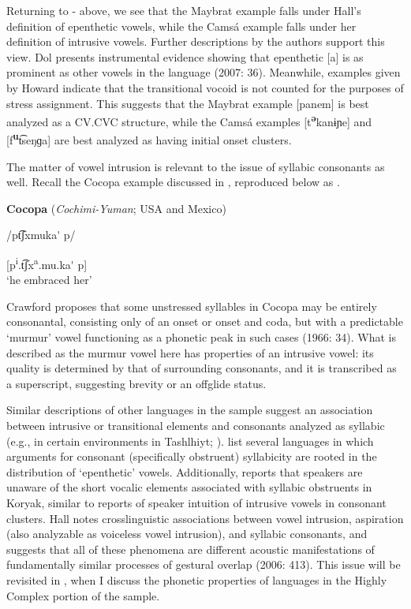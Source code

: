   Returning to - above, we see that the Maybrat example falls under Hall’s definition of epenthetic vowels, while the Camsá example falls under her definition of intrusive vowels. Further descriptions by the authors support this view. Dol presents instrumental evidence showing that epenthetic [a] is as prominent as other vowels in the language (2007: 36). Meanwhile, examples given by Howard indicate that the transitional vocoid is not counted for the purposes of stress assignment. This suggests that the Maybrat example [panem] is best analyzed as a CV.CVC structure, while the Camsá examples [t\textbf{\textsuperscript{ə}}kanɨɲe] and [f\textbf{\textsuperscript{u}}t͡seŋɡa] are best analyzed as having initial onset clusters.

  The matter of vowel intrusion is relevant to the issue of syllabic consonants as well. Recall the Cocopa example discussed in , reproduced below as .

\ea\label{ex:3.10}
  \textbf{Cocopa} (\textit{Cochimi-Yuman}; USA and Mexico)

/pt͡ʃxmuka\'{} p/

[p\textsuperscript{i}.t͡ʃx\textsuperscript{a}.mu.ka\'{} p]\\
\glt ‘he embraced her’
\citep[43]{Crawford1966}
\z

Crawford proposes that some unstressed syllables in Cocopa may be entirely consonantal, consisting only of an onset or onset and coda, but with a predictable ‘murmur’ vowel functioning as a phonetic peak in such cases (1966: 34). What is described as the murmur vowel here has properties of an intrusive vowel: its quality is determined by that of surrounding consonants, and it is transcribed as a superscript, suggesting brevity or an offglide status.

  Similar descriptions of other languages in the sample suggest an association between intrusive or transitional elements and consonants analyzed as syllabic (e.g., in certain environments in Tashlhiyt; \citealt{DellElmedlaoui2002}). \citet{HargusBeavert2006} list several languages in which arguments for consonant (specifically obstruent) syllabicity are rooted in the distribution of ‘epenthetic’ vowels. Additionally, \citet[185-6]{Bell1978a} reports that speakers are unaware of the short vocalic elements associated with syllabic obstruents in Koryak, similar to reports of speaker intuition of intrusive vowels in consonant clusters. Hall notes crosslinguistic associations between vowel intrusion, aspiration (also analyzable as voiceless vowel intrusion), and syllabic consonants, and suggests that all of these phenomena are different acoustic manifestations of fundamentally similar processes of gestural overlap (2006: 413). This issue will be revisited in , when I discuss the phonetic properties of languages in the Highly Complex portion of the sample.

